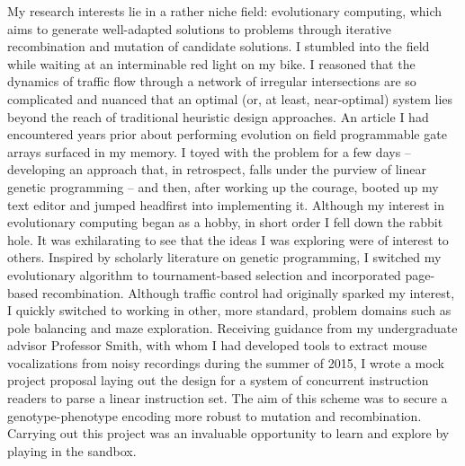 \documentclass[12pt]{book}
\begin{document}

My research interests lie in a rather niche field: evolutionary computing, which aims to generate well-adapted solutions to problems through iterative recombination and mutation of candidate solutions. I stumbled into the field while waiting at an interminable red light on my bike. I reasoned that the dynamics of traffic flow through a network of irregular intersections are so complicated and nuanced that an optimal (or, at least, near-optimal) system lies beyond the reach of traditional heuristic design approaches. An article I had encountered years prior about performing evolution on field programmable gate arrays surfaced in my memory. I toyed with the problem for a few days -- developing an approach that, in retrospect, falls under the purview of linear genetic programming -- and then, after working up the courage, booted up my text editor and jumped headfirst into implementing it. Although my interest in evolutionary computing began as a hobby, in short order I fell down the rabbit hole. It was exhilarating to see that the ideas I was exploring were of interest to others. Inspired by scholarly literature on genetic programming, I switched my evolutionary algorithm to tournament-based selection and incorporated page-based recombination. Although traffic control had originally sparked my interest, I quickly switched to working in other, more standard, problem domains such as pole balancing and maze exploration. Receiving guidance from my undergraduate advisor Professor Smith, with whom I had developed tools to extract mouse vocalizations from noisy recordings during the summer of 2015, I wrote a mock project proposal laying out the design for a system of concurrent instruction readers to parse a linear instruction set. The aim of this scheme was to secure a genotype-phenotype encoding more robust to mutation and recombination. Carrying out this project was an invaluable opportunity to learn and explore by playing in the sandbox.
\end{document}
